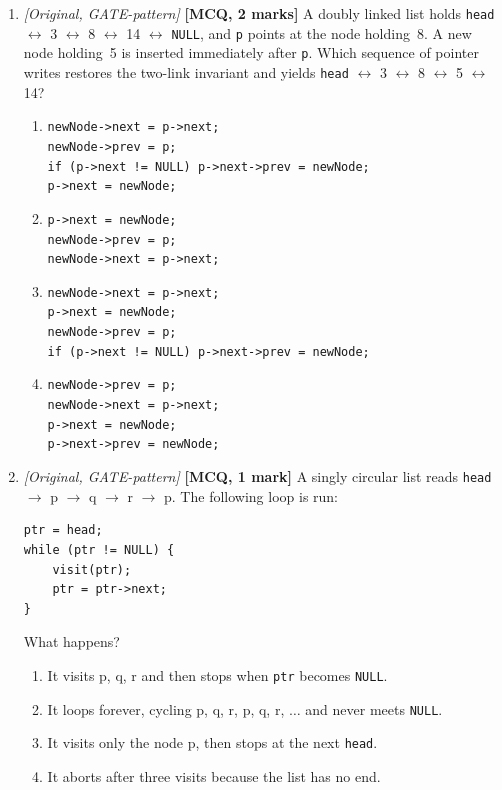 \documentclass[11pt]{article}
\begin{document}
\begin{enumerate}
\item[\textbf{Q7}] \textit{[Original, GATE-pattern]} \textbf{[MCQ, 2 marks]} A doubly linked list holds \texttt{head} $\leftrightarrow$ 3 $\leftrightarrow$ 8 $\leftrightarrow$ 14 $\leftrightarrow$ \texttt{NULL}, and \texttt{p} points at the node holding~8. A new node holding~5 is inserted immediately after \texttt{p}. Which sequence of pointer writes restores the two-link invariant and yields \texttt{head} $\leftrightarrow$ 3 $\leftrightarrow$ 8 $\leftrightarrow$ 5 $\leftrightarrow$ 14?
\begin{enumerate}
  \item[(A)] \texttt{newNode->next = p->next;}\\
  \texttt{newNode->prev = p;}\\
  \texttt{if (p->next != NULL) p->next->prev = newNode;}\\
  \texttt{p->next = newNode;}
  \item[(B)] \texttt{p->next = newNode;}\\
  \texttt{newNode->prev = p;}\\
  \texttt{newNode->next = p->next;}
  \item[(C)] \texttt{newNode->next = p->next;}\\
  \texttt{p->next = newNode;}\\
  \texttt{newNode->prev = p;}\\
  \texttt{if (p->next != NULL) p->next->prev = newNode;}
  \item[(D)] \texttt{newNode->prev = p;}\\
  \texttt{newNode->next = p->next;}\\
  \texttt{p->next = newNode;}\\
  \texttt{p->next->prev = newNode;}
\end{enumerate}

\item[\textbf{Q8}] \textit{[Original, GATE-pattern]} \textbf{[MCQ, 1 mark]} A singly circular list reads \texttt{head} $\to$ p $\to$ q $\to$ r $\to$ p. The following loop is run:
\begin{verbatim}
ptr = head;
while (ptr != NULL) {
    visit(ptr);
    ptr = ptr->next;
}
\end{verbatim}
What happens?
\begin{enumerate}
  \item[(A)] It visits p, q, r and then stops when \texttt{ptr} becomes \texttt{NULL}.
  \item[(B)] It loops forever, cycling p, q, r, p, q, r, $\dots$ and never meets \texttt{NULL}.
  \item[(C)] It visits only the node p, then stops at the next \texttt{head}.
  \item[(D)] It aborts after three visits because the list has no end.
\end{enumerate}


\end{enumerate}
\end{document}
